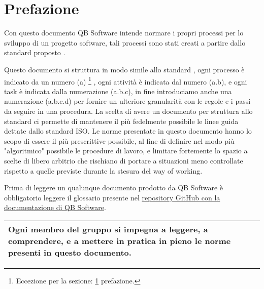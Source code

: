 \section{Prefazione} \label{sec:prefazione}
    Con questo documento QB Software intende normare i propri processi per lo sviluppo di un progetto software, tali processi sono stati creati a partire dallo standard proposto \cite{bib:ISO12207_1997}.

    Questo documento si struttura in modo simile allo standard \cite{bib:ISO12207_1997}, ogni processo è indicato da un numero (a)%
    \footnote{Eccezione per la sezione: \ref{sec:prefazione} prefazione.}%
    , ogni attività è indicata dal numero (a.b), e ogni task è indicata dalla numerazione (a.b.c), in fine introduciamo anche una numerazione (a.b.c.d) per fornire un ulteriore granularità con le regole e i passi da seguire in una procedura. La scelta di avere un documento per struttura allo standard ci permette di mantenere il più fedelmente possibile le linee guida dettate dallo standard ISO. Le norme presentate in questo documento hanno lo scopo di essere il più prescrittive possibile, al fine di definire nel modo più "algoritmico" possibile le procedure di lavoro, e limitare fortemente lo spazio a scelte di libero arbitrio che rischiano di portare a situazioni meno controllate rispetto a quelle previste durante la stesura del way of working. 

    Prima di leggere un qualunque documento prodotto da QB Software è obbligatorio leggere il glossario presente nel \href{https://github.com/QB-Software-swe/docs}{repository GitHub con la documentazione di QB Software}.

    \begin{center}
        \begin{tabularx}{0.85\textwidth}{>{\centering\arraybackslash}X}
            \toprule
            Ogni membro del gruppo si impegna a leggere, a comprendere, e a mettere in pratica in pieno le norme presenti in questo documento.
            \\\bottomrule
        \end{tabularx}
    \end{center}